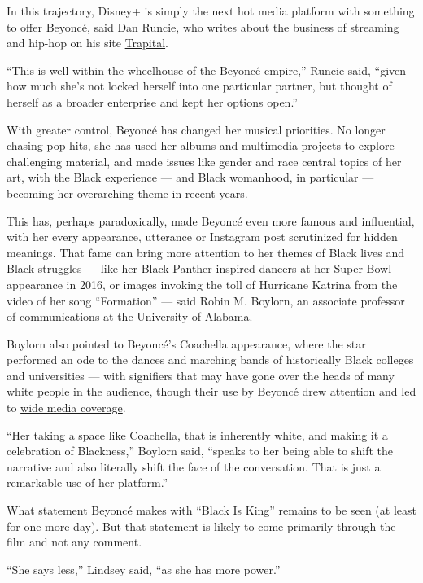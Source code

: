 In this trajectory, Disney+ is simply the next hot media platform with
something to offer Beyoncé, said Dan Runcie, who writes about the
business of streaming and hip-hop on his site
\href{https://trapital.co/2019/04/18/beyonces-streaming-strategy-explained/}{Trapital}.

``This is well within the wheelhouse of the Beyoncé empire,'' Runcie
said, ``given how much she's not locked herself into one particular
partner, but thought of herself as a broader enterprise and kept her
options open.''

With greater control, Beyoncé has changed her musical priorities. No
longer chasing pop hits, she has used her albums and multimedia projects
to explore challenging material, and made issues like gender and race
central topics of her art, with the Black experience --- and Black
womanhood, in particular --- becoming her overarching theme in recent
years.

This has, perhaps paradoxically, made Beyoncé even more famous and
influential, with her every appearance, utterance or Instagram post
scrutinized for hidden meanings. That fame can bring more attention to
her themes of Black lives and Black struggles --- like her Black
Panther-inspired dancers at her Super Bowl appearance in 2016, or images
invoking the toll of Hurricane Katrina from the video of her song
``Formation'' --- said Robin M. Boylorn, an associate professor of
communications at the University of Alabama.

Boylorn also pointed to Beyoncé's Coachella appearance, where the star
performed an ode to the dances and marching bands of historically Black
colleges and universities --- with signifiers that may have gone over
the heads of many white people in the audience, though their use by
Beyoncé drew attention and led to
\href{https://time.com/5574035/beyonce-homecoming-hbcu-history/}{wide
media coverage}.

``Her taking a space like Coachella, that is inherently white, and
making it a celebration of Blackness,'' Boylorn said, ``speaks to her
being able to shift the narrative and also literally shift the face of
the conversation. That is just a remarkable use of her platform.''

What statement Beyoncé makes with ``Black Is King'' remains to be seen
(at least for one more day). But that statement is likely to come
primarily through the film and not any comment.

``She says less,'' Lindsey said, ``as she has more power.''

